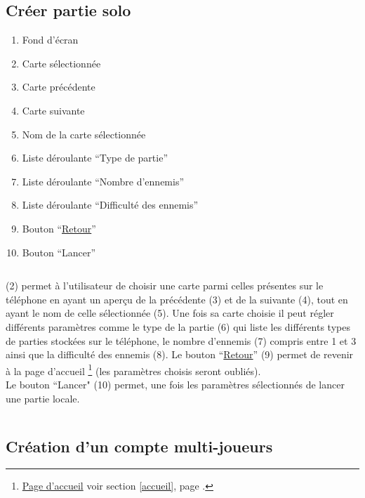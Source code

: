 \documentclass{report}
\begin{document}
	\subsection{Créer partie solo}
	
		\hypertarget{Creer partie solo}{}
		\label{Creer partie solo}
	
		
		
		\begin{enumerate}
		  \item Fond d'écran
		  \item Carte sélectionnée
		  \item Carte précédente
		  \item Carte suivante
		  \item Nom de la carte sélectionnée
		  \item Liste déroulante ``Type de partie''
		  \item Liste déroulante ``Nombre d'ennemis''
		  \item Liste déroulante ``Difficulté des ennemis''
		  \item Bouton ``\hyperlink{Page d'accueil}{Retour}''
		  \item Bouton ``Lancer'' 
		\end{enumerate}
		
		$\,$
		
		(2) permet à l'utilisateur de choisir une carte parmi celles présentes sur le
		téléphone en ayant un aperçu de la précédente (3) et de la suivante (4), tout
		en ayant le nom de celle sélectionnée (5). Une fois sa carte choisie il peut 
		régler différents paramètres comme le type de la partie (6) qui liste les
		différents types de parties stockées sur le téléphone, le nombre d'ennemis (7)
		compris entre 1 et 3 ainsi que la difficulté des ennemis (8).
		Le bouton ``\hyperlink{Page d'accueil}{Retour}'' (9) permet de revenir à la page d'accueil%
		\footnote[1]{
			\hyperlink{Page d'accueil}{Page d'accueil}
			\og voir section \ref{accueil}, page \pageref{accueil}.\fg
		}
		(les paramètres choisis seront oubliés).\\
		Le bouton ``Lancer" (10) permet, une fois les paramètres sélectionnés de
		lancer une partie locale.
		
		$\,$
	
\newpage

	\subsection{Création d'un compte multi-joueurs}
	
\end{document}
